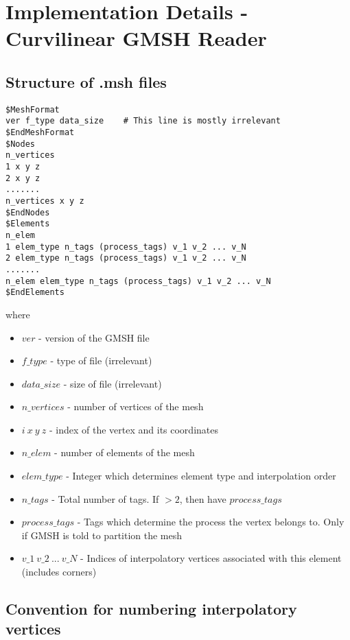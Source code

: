 
\section{Implementation Details - Curvilinear GMSH Reader}

\subsection{Structure of .msh files}

\begin{mybox}
\begin{lstlisting}
$MeshFormat
ver f_type data_size    # This line is mostly irrelevant
$EndMeshFormat
$Nodes
n_vertices
1 x y z
2 x y z
.......
n_vertices x y z
$EndNodes
$Elements
n_elem
1 elem_type n_tags (process_tags) v_1 v_2 ... v_N
2 elem_type n_tags (process_tags) v_1 v_2 ... v_N
.......
n_elem elem_type n_tags (process_tags) v_1 v_2 ... v_N
$EndElements
\end{lstlisting}
\end{mybox}

\noindent
where
\begin{itemize}
	\item $ver$             - version of the GMSH file
	\item $f\_type$          - type of file (irrelevant)
	\item $data\_size$       - size of file (irrelevant)
	\item $n\_vertices$      - number of vertices of the mesh
	\item $i\ x\ y\ z$         - index of the vertex and its coordinates
	\item $n\_elem$          - number of elements of the mesh
	\item $elem\_type$       - Integer which determines element type and interpolation order
	\item $n\_tags$          - Total number of tags. If $>2$, then have $process\_tags$
	\item $process\_tags$    - Tags which determine the process the vertex belongs to. Only if GMSH is told to partition the mesh
	\item $v\_1\ v\_2\ ...\ v\_N$ - Indices of interpolatory vertices associated with this element (includes corners)
\end{itemize}

\subsection{Convention for numbering interpolatory vertices}
\label{impl-gmsh-numbering-convention}

